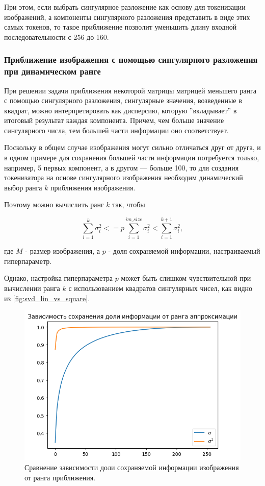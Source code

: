 При этом, если выбрать сингулярное разложение как основу для токенизации изображений, а компоненты сингулярного разложения представить в виде этих самых токенов, то такое приближение позволит уменьшить длину входной последовательности с 256 до 160.

\subsubsection{Приближение изображения с помощью сингулярного разложения при динамическом ранге}

При решении задачи приближения некоторой матрицы матрицей меньшего ранга с помощью сингулярного разложения, сингулярные значения, возведенные в квадрат, можно интерпретировать как дисперсию, которую ''вкладывает'' в итоговый результат каждая компонента. Причем, чем больше значение сингулярного числа, тем большей части информации оно соответствует. 

Поскольку в общем случае изображения могут сильно отличаться друг от друга, и в одном примере для сохранения большей части информации потребуется только, например, 5 первых компонент, а в другом --- больше 100, то для создания токенизатора на основе сингулярного изображения необходим динамический выбор ранга $k$ приближения изображения.   

Поэтому можно вычислить ранг $k$ так, чтобы

$$
    \sum_{i=1}^{k} \sigma_i^2 <= p\sum_{i=1}^{im\_size} \sigma_i^2 < \sum_{i=1}^{k+1} \sigma_i^2,
$$

где $M$ - размер изображения, а $p$ - доля сохраняемой информации, настраиваемый гиперпараметр.

Однако, настройка гиперпараметра $p$ может быть слишком чувствительной при вычислении ранга $k$ с использованием квадратов сингулярных чисел, как видно из \autoref{fig:svd_lin_vs_square}.

\begin{figure}[H]
    \centering
    \includegraphics[width=1.0\textwidth]
    {images/solutions_analysis/svd/svd_lin_vs_square.png}
    \caption{Сравнение зависимости доли сохраняемой информации изображения от ранга приближения.}
    \label{fig:svd_lin_vs_square}
\end{figure}

